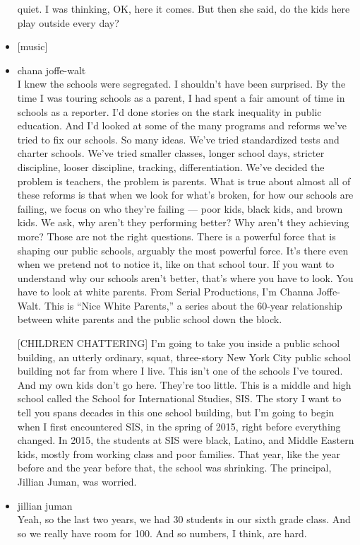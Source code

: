 \begin{itemize}
  quiet. I was thinking, OK, here it comes. But then she said, do the
  kids here play outside every day?
\item
  {[}music{]}
\item
  chana joffe-walt\\
  I knew the schools were segregated. I shouldn't have been surprised.
  By the time I was touring schools as a parent, I had spent a fair
  amount of time in schools as a reporter. I'd done stories on the stark
  inequality in public education. And I'd looked at some of the many
  programs and reforms we've tried to fix our schools. So many ideas.
  We've tried standardized tests and charter schools. We've tried
  smaller classes, longer school days, stricter discipline, looser
  discipline, tracking, differentiation. We've decided the problem is
  teachers, the problem is parents. What is true about almost all of
  these reforms is that when we look for what's broken, for how our
  schools are failing, we focus on who they're failing --- poor kids,
  black kids, and brown kids. We ask, why aren't they performing better?
  Why aren't they achieving more? Those are not the right questions.
  There is a powerful force that is shaping our public schools, arguably
  the most powerful force. It's there even when we pretend not to notice
  it, like on that school tour. If you want to understand why our
  schools aren't better, that's where you have to look. You have to look
  at white parents. From Serial Productions, I'm Channa Joffe-Walt. This
  is ``Nice White Parents,'' a series about the 60-year relationship
  between white parents and the public school down the block.

  {[}CHILDREN CHATTERING{]} I'm going to take you inside a public school
  building, an utterly ordinary, squat, three-story New York City public
  school building not far from where I live. This isn't one of the
  schools I've toured. And my own kids don't go here. They're too
  little. This is a middle and high school called the School for
  International Studies, SIS. The story I want to tell you spans decades
  in this one school building, but I'm going to begin when I first
  encountered SIS, in the spring of 2015, right before everything
  changed. In 2015, the students at SIS were black, Latino, and Middle
  Eastern kids, mostly from working class and poor families. That year,
  like the year before and the year before that, the school was
  shrinking. The principal, Jillian Juman, was worried.
\item
  jillian juman\\
  Yeah, so the last two years, we had 30 students in our sixth grade
  class. And so we really have room for 100. And so numbers, I think,
  are hard.
\end{itemize}

